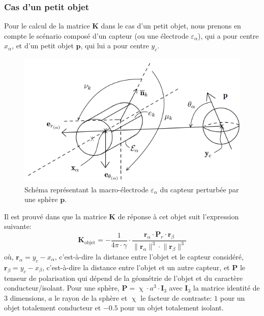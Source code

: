 \subsubsection{Cas d'un petit objet}
Pour le calcul de la matrice $\mathbf{K}$ dans le cas d'un petit objet, nous prenons en compte le scénario composé d'un capteur (ou une électrode $\varepsilon_{\alpha}$), qui a pour centre $x_\alpha$, et d'un petit objet $\mathbf{p}$, qui lui a pour centre $y_c$.
\begin{figure}[h!]
    \centering
    \includegraphics{doc/img/schema_petit_objet.png}
    \caption{\centering Schéma représentant la macro-électrode $\varepsilon_{\alpha}$ du capteur perturbée par une sphère $\mathbf{p}$.}
    \label{fig:schema_petit_objet}
\end{figure}
Il est prouvé dans \cite{Boyer2012} que la matrice $\mathbf{K}$ de réponse à cet objet suit l'expression suivante: 
\begin{equation}
    \mathbf{K}_{\text{objet}} = - \frac{1}{4\pi \cdot \gamma} \cdot \frac{\mathbf{r}_\alpha \cdot \mathbf{P}_r \cdot \mathbf{r}_\beta}{\lVert \mathbf{r}_\alpha \rVert^3 \cdot \lVert \mathbf{r}_\beta \rVert^3}
\end{equation}
où, $\mathbf{r}_\alpha = y_c - x_\alpha$, c'est-à-dire la distance entre l'objet et le capteur considéré, $\mathbf{r}_\beta = y_c - x_\beta$, c'est-à-dire la distance entre l'objet et un autre capteur, et $\mathbf{P}$ le tenseur de polarisation qui dépend de la géométrie de l'objet et du caractère conducteur/isolant. Pour une sphère, $\mathbf{P} = \upchi \cdot a^3 \cdot \mathbf{I}_{3}$ avec $\mathbf{I}_3$ la matrice identité de $3$ dimensions, $a$ le rayon de la sphère et $\upchi$ le facteur de contraste: $1$ pour un objet totalement conducteur et $-0.5$ pour un objet totalement isolant.

